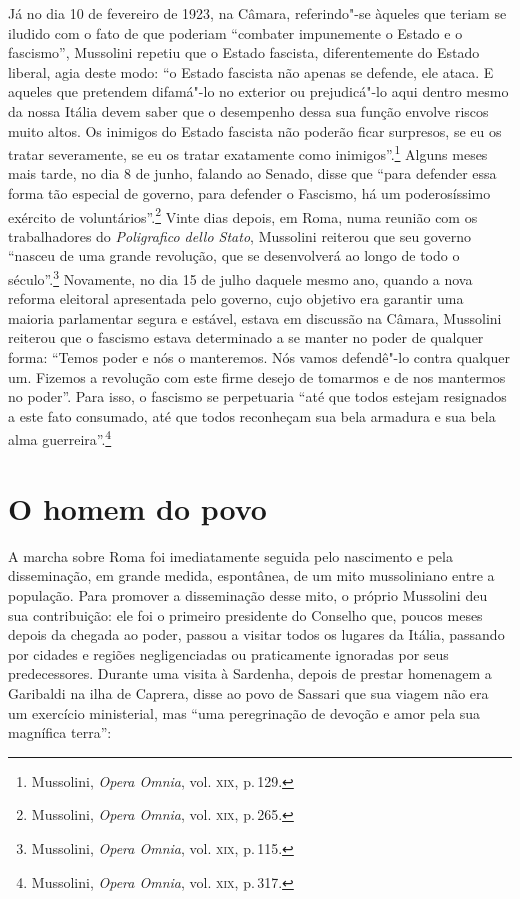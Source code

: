 Já no dia 10 de fevereiro de 1923, na Câmara, referindo"-se àqueles que
teriam se iludido com o fato de que poderiam ``combater impunemente o
Estado e o fascismo'', Mussolini repetiu que o Estado fascista,
diferentemente do Estado liberal, agia deste modo: ``o Estado fascista
não apenas se defende, ele ataca. E aqueles que pretendem difamá"-lo no
exterior ou prejudicá"-lo aqui dentro mesmo da nossa Itália devem saber
que o desempenho dessa sua função envolve riscos muito altos. Os
inimigos do Estado fascista não poderão ficar surpresos, se eu os tratar
severamente, se eu os tratar exatamente como inimigos''.\footnote{Mussolini,
  \emph{Opera Omnia}, vol. \textsc{xix}, p.\,129.} Alguns meses mais tarde, no
dia 8 de junho, falando ao Senado, disse que ``para defender essa forma
tão especial de governo, para defender o Fascismo, há um poderosíssimo
exército de voluntários''.\footnote{Mussolini, \emph{Opera Omnia}, vol.
  \textsc{xix}, p.\,265.} Vinte dias depois, em Roma, numa reunião com os
trabalhadores do \emph{Poligrafico dello Stato}, Mussolini reiterou que
seu governo ``nasceu de uma grande revolução, que se desenvolverá ao
longo de todo o século''.\footnote{Mussolini, \emph{Opera Omnia}, vol.
  \textsc{xix}, p.\,115.} Novamente, no dia 15 de julho daquele mesmo ano, quando
a nova reforma eleitoral apresentada pelo governo, cujo objetivo era
garantir uma maioria parlamentar segura e estável, estava em discussão
na Câmara, Mussolini reiterou que o fascismo estava determinado a se
manter no poder de qualquer forma: ``Temos poder e nós o manteremos. Nós
vamos defendê"-lo contra qualquer um. Fizemos a revolução com este firme
desejo de tomarmos e de nos mantermos no poder''. Para isso, o fascismo
se perpetuaria ``até que todos estejam resignados a este fato consumado,
até que todos reconheçam sua bela armadura e sua bela alma
guerreira''.\footnote{Mussolini, \emph{Opera Omnia}, vol. \textsc{xix}, p.\,317.}

\section{O homem do povo}

A marcha sobre Roma foi imediatamente seguida pelo nascimento e pela
disseminação, em grande medida, espontânea, de um mito mussoliniano
entre a população. Para promover a disseminação desse mito, o próprio
Mussolini deu sua contribuição: ele foi o primeiro presidente do
Conselho que, poucos meses depois da chegada ao poder, passou a visitar
todos os lugares da Itália, passando por cidades e regiões
negligenciadas ou praticamente ignoradas por seus predecessores. Durante
uma visita à Sardenha, depois de prestar homenagem a Garibaldi na ilha
de Caprera, disse ao povo de Sassari que sua viagem não era um exercício
ministerial, mas ``uma peregrinação de devoção e amor pela sua magnífica
terra'':

